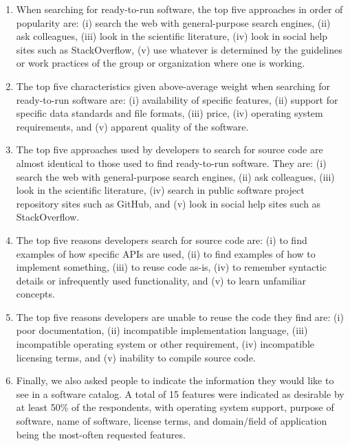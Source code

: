 \documentclass{casicswhitepaper}
\begin{document}
\begin{enumerate}

\item When searching for ready-to-run software, the top five approaches in order of popularity are: (i) search the web with general-purpose search engines, (ii) ask colleagues, (iii) look in the scientific literature, (iv) look in social help sites such as StackOverflow, (v) use whatever is determined by the guidelines or work practices of the group or organization where one is working.

\item The top five characteristics given above-average weight when searching for ready-to-run software are: (i) availability of specific features, (ii) support for specific data standards and file formats, (iii) price, (iv) operating system requirements, and (v) apparent quality of the software.

\item The top five approaches used by developers to search for source code are almost identical to those used to find ready-to-run software.  They are: (i) search the web with general-purpose search engines, (ii) ask colleagues, (iii) look in the scientific literature, (iv) search in public software project repository sites such as GitHub, and (v) look in social help sites such as StackOverflow.

\item The top five reasons developers search for source code are: (i) to find examples of how specific APIs are used, (ii) to find examples of how to implement something, (iii) to reuse code as-is, (iv) to remember syntactic details or infrequently used functionality, and (v) to learn unfamiliar concepts.

\item The top five reasons developers are unable to reuse the code they find are: (i) poor documentation, (ii) incompatible implementation language, (iii) incompatible operating system or other requirement, (iv) incompatible licensing terms, and (v) inability to compile source code.

\item Finally, we also asked people to indicate the information they would like to see in a software catalog.  A total of 15 features were indicated as desirable by at least 50\% of the respondents, with operating system support, purpose of software, name of software, license terms, and domain/field of application being the most-often requested features.

\end{enumerate}
\end{document}
